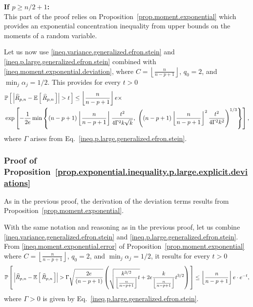 \documentclass[twoside,11pt]{article}
\numberwithin{equation}{section}
\newcommand{\gp}[1]{\left(#1\right)}
\newcommand{\gc}[1]{\left[#1\right]}
\newcommand{\floor}[1]{\left\lfloor #1 \right\rfloor}
\newcommand{\1}{\mathds{1}}%
\newcommand{\paren}[1]{\left( #1 \right)}
\newcommand{\croch}[1]{\left[\, #1 \,\right]}
\newcommand{\acc}[1]{\left\{ #1 \right\}}
\newcommand{\abs}[1]{\left\lvert #1 \right\rvert} %
\newcommand{\E}{\mathbb{E}}
\renewcommand{\P}{\mathbb{P}}
\newcommand{\Rh}{\widehat{R}}
\numberwithin{equation}{section}
\theoremstyle{plain}
\begin{document}
\noindent\textbf{If $p\geq n/2+1$:}
~\\
%
This part of the proof relies on Proposition~\ref{prop.moment.exponential} which provides an exponential concentration inequality from upper bounds on the moments of a random variable.

\medskip

%
Let us now use \eqref{ineq.variance.generalized.efron.stein} and \eqref{ineq.p.large.generalized.efron.stein} combined with \eqref{ineq.moment.exponential.deviation}, where $C=\floor{\frac{n}{n-p+1}}$, $q_0=2$, and $\min_j \alpha_j = 1/2$.
%
This provides for every $t>0$
\begin{align*}
 & \P\croch{ \abs{\Rh_{p,n} - \E\croch{\Rh_{p,n}}} > t } \leq  \floor{\frac{n}{n-p+1}} e \times \\
 &\exp\gc{- \frac{1}{2e} \min\acc{  \paren{n-p+1}\floor{\frac{n}{n-p+1}}\frac{t^2 }{4\Gamma^2 k \sqrt{k}}  , \  \gp{ (n-p+1) \floor{\frac{n}{n-p+1}}^2\frac{ t^2}{4\Gamma^2k^2} }^{1/3} }  }  , \hfill
\end{align*}
where $\Gamma$ arises from Eq.~\eqref{ineq.p.large.generalized.efron.stein}.





\subsubsection{Proof of Proposition~\ref{prop.exponential.inequality.p.large.explicit.deviations}}

As in the previous proof, the derivation of the deviation terms results from Proposition~\ref{prop.moment.exponential}.

\medskip

With the same notation and reasoning as in the previous proof, let us combine  \eqref{ineq.variance.generalized.efron.stein} and \eqref{ineq.p.large.generalized.efron.stein}.
%
From \eqref{ineq.moment.exponential.error} of  Proposition~\ref{prop.moment.exponential} where $C=\floor{\frac{n}{n-p+1}}$, $q_0=2$, and $\min_j \alpha_j = 1/2$, it results for every $t>0$
%
\begin{align*}
 \P\croch{ \abs{\Rh_{p,n} - \E\croch{\Rh_{p,n}}} > \Gamma \sqrt{\frac{2e }{(n-p+1)}} \paren{ \sqrt{\frac{k^{3/2}}{\floor{\frac{n}{n-p+1} } } t }  +   2e \frac{k}{ \floor{\frac{n}{n-p+1} } } t^{3/2} } } \leq \floor{\frac{n}{n-p+1}} e \cdot e^{-t} , \hfill
\end{align*}
where $\Gamma>0$ is given by Eq.~\eqref{ineq.p.large.generalized.efron.stein}.
\end{document}
